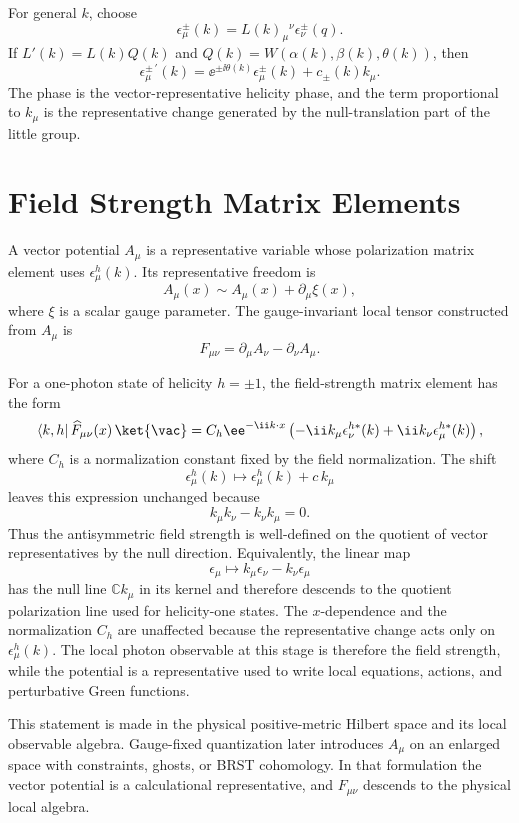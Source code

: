 For general \(k\), choose
\[
  \epsilon_\mu^\pm(k)=L(k)_\mu{}^\nu\epsilon_\nu^\pm(q).
\]
If \(L'(k)=L(k)Q(k)\) and
\(Q(k)=W(\alpha(k),\beta(k),\theta(k))\), then
\[
  \epsilon_\mu^{\pm\,\prime}(k)
  =
  \ee^{\pm\ii\theta(k)}\epsilon_\mu^\pm(k)+c_\pm(k)k_\mu .
\]
The phase is the vector-representative helicity phase, and the term
proportional to \(k_\mu\) is the representative change generated by the
null-translation part of the little group.

\section{Field Strength Matrix Elements}

A vector potential \(A_\mu\) is a representative variable whose polarization
matrix element uses \(\epsilon_\mu^h(k)\). Its representative freedom is
\[
  A_\mu(x)\sim A_\mu(x)+\partial_\mu\xi(x),
\]
where \(\xi\) is a scalar gauge parameter. The gauge-invariant local tensor
constructed from \(A_\mu\) is
\[
  F_{\mu\nu}
  =
  \partial_\mu A_\nu-\partial_\nu A_\mu .
\]

For a one-photon state of helicity \(h=\pm1\), the field-strength matrix
element has the form
\[
  \langle k,h|\,\widehat F_{\mu\nu}(x)\,\ket{\vac}
  =
  C_h\ee^{-\ii k\cdot x}
  \left(
    -\ii k_\mu\epsilon_\nu^{h*}(k)
    +\ii k_\nu\epsilon_\mu^{h*}(k)
  \right),
\]
where \(C_h\) is a normalization constant fixed by the field normalization.
The shift
\[
  \epsilon_\mu^h(k)\mapsto\epsilon_\mu^h(k)+c\,k_\mu
\]
leaves this expression unchanged because
\[
  k_\mu k_\nu-k_\nu k_\mu=0.
\]
Thus the antisymmetric field strength is well-defined on the quotient of
vector representatives by the null direction.  Equivalently, the linear map
\[
  \epsilon_\mu\longmapsto k_\mu\epsilon_\nu-k_\nu\epsilon_\mu
\]
has the null line \(\mathbb C k_\mu\) in its kernel and therefore descends to
the quotient polarization line used for helicity-one states.  The
\(x\)-dependence and the normalization \(C_h\) are unaffected because the
representative change acts only on \(\epsilon_\mu^h(k)\).
The local photon observable at this stage is therefore the field strength,
while the potential is a representative used to write local equations,
actions, and perturbative Green functions.

\begin{remark}
This statement is made in the physical positive-metric Hilbert space and its
local observable algebra. Gauge-fixed quantization later introduces
\(A_\mu\) on an enlarged space with constraints, ghosts, or BRST
cohomology. In that formulation the vector potential is a calculational
representative, and \(F_{\mu\nu}\) descends to the physical local algebra.
\end{remark}

